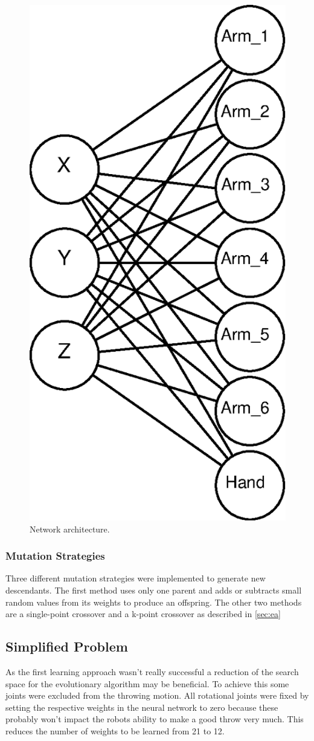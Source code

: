 \begin{figure}[h]
\centering
\includegraphics[width=.5\columnwidth]{figures/net.eps}
\caption{Network architecture.}
\label{fig:network}
\end{figure}

\subsubsection{Mutation Strategies}
Three different mutation strategies were implemented to generate new descendants.
The first method uses only one parent and adds or subtracts small random values from its weights to produce an offspring.
The other two methods are a single-point crossover and a k-point crossover as described in \autoref{sec:ea}

\subsection{Simplified Problem}
As the first learning approach wasn't really successful a reduction of the search space for the evolutionary algorithm may be beneficial.
To achieve this some joints were excluded from the throwing motion.
All rotational joints were fixed by setting the respective weights in the neural network to zero because these probably won't impact the robots ability to make a good throw very much.
This reduces the number of weights to be learned from 21 to 12.